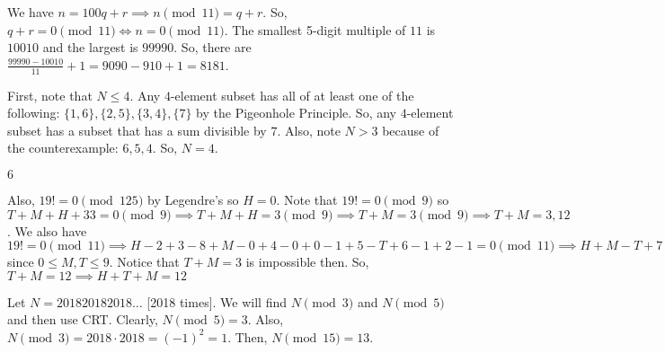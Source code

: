 \documentclass[11pt]{article}
\begin{document}

\begin{sol}
We have $n=100q+r\implies n\pmod{11}=q+r$. So, $q+r=0\pmod{11}\iff n=0\pmod{11}$. The smallest 5-digit multiple of $11$ is $10010$ and the largest is $99990$. So, there are $\frac{99990-10010}{11}+1=9090-910+1=\boxed{8181}$.
\end{sol}


\begin{sol}
First, note that $N\leq 4$. Any $4$-element subset has all of at least one of the following: $\{1,6\},\{2,5\},\{3,4\},\{7\}$ by the Pigeonhole Principle. So, any $4$-element subset has a subset that has a sum divisible by $7$. Also, note $N>3$ because of the counterexample: $6,5,4$. So, $N=\boxed{4}$. 
\end{sol}


\begin{sol}
$\boxed{6}$
\end{sol}

\begin{sol}
Also, $19!=0\pmod{125}$ by Legendre's so $H=0$. Note that $19!=0\pmod{9}$ so $T+M+H+33=0\pmod{9}\implies T+M+H=3\pmod{9}\implies T+M=3\pmod{9}\implies T+M=3,12$.  We also have $19!=0\pmod{11}\implies H-2+3-8+M-0+4-0+0-1+5-T+6-1+2-1=0\pmod{11}\implies H+M-T+7=0\pmod{11}\implies H+M-T=4\pmod{11}\implies M-T=4\pmod{11}\implies M-T=4$ since $0\leq M,T\leq 9$. Notice that $T+M=3$ is impossible then. So, $T+M=12\implies H+T+M=\boxed{12}$
\end{sol}


\begin{sol}
Let $N=201820182018\ldots$ [2018 times]. We will find $N\pmod{3}$ and $N\pmod{5}$ and then use CRT. Clearly, $N\pmod{5}=3$. Also, $N\pmod{3}=2018\cdot 2018=(-1)^2=1$. Then, $N\pmod{15}=\boxed{13}$.
\end{sol}
\end{document}
